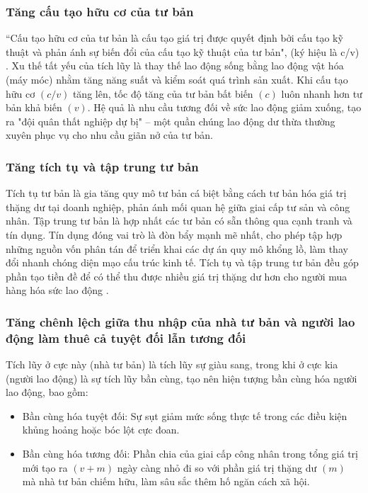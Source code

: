 \subsubsection{Tăng cấu tạo hữu cơ của tư bản}
“Cấu tạo hữu cơ của tư bản là cấu tạo giá trị được quyết định bởi cấu tạo kỹ thuật và phản ánh sự biến đổi của cấu tạo kỹ thuật của tư bản", (ký hiệu là c/v) \cite[trang 97]{gt}. Xu thế tất yếu của tích lũy là thay thế lao động sống bằng lao động vật hóa (máy móc) nhằm tăng năng suất và kiểm soát quá trình sản xuất. Khi cấu tạo hữu cơ $(c/v)$ tăng lên, tốc độ tăng của tư bản bất biến $(c)$ luôn nhanh hơn tư bản khả biến $(v)$. Hệ quả là nhu cầu tương đối về sức lao động giảm xuống, tạo ra "đội quân thất nghiệp dự bị" – một quần chúng lao động dư thừa thường xuyên phục vụ cho nhu cầu giãn nở của tư bản.

\subsubsection{Tăng tích tụ và tập trung tư bản}

Tích tụ tư bản là gia tăng quy mô tư bản cá biệt bằng cách tư bản hóa giá trị thặng dư tại doanh nghiệp, phản ánh mối quan hệ giữa giai cấp tư sản và công nhân. Tập trung tư bản là hợp nhất các tư bản có sẵn thông qua cạnh tranh và tín dụng. Tín dụng đóng vai trò là đòn bẩy mạnh mẽ nhất, cho phép tập hợp những nguồn vốn phân tán để triển khai các dự án quy mô khổng lồ, làm thay đổi nhanh chóng diện mạo cấu trúc kinh tế. Tích tụ và tập trung tư bản đều góp phần tạo tiền đề để có thể thu được nhiều giá trị thặng dư hơn cho người mua hàng hóa sức lao động \cite[trang 98]{gt}.

\subsubsection{Tăng chênh lệch giữa thu nhập của nhà tư bản và người lao động làm thuê cả tuyệt đối lẫn tương đối}

Tích lũy ở cực này (nhà tư bản) là tích lũy sự giàu sang, trong khi ở cực kia (người lao động) là sự tích lũy bần cùng, tạo nên hiện tượng bần cùng hóa người lao động, bao gồm:

\begin{itemize}
    \item Bần cùng hóa tuyệt đối: Sự sụt giảm mức sống thực tế trong các điều kiện khủng hoảng hoặc bóc lột cực đoan.
    \item Bần cùng hóa tương đối: Phần chia của giai cấp công nhân trong tổng giá trị mới tạo ra $(v+m)$ ngày càng nhỏ đi so với phần giá trị thặng dư $(m)$ mà nhà tư bản chiếm hữu, làm sâu sắc thêm hố ngăn cách xã hội.

\end{itemize}
